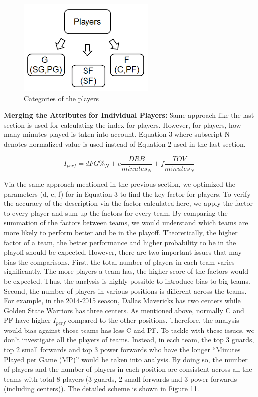 \documentclass{acm_proc_article-sp}
\begin{document}
\begin{figure}[!htb]
\centering
\includegraphics{Fig-10.png}
\caption{Categories of the players}
\end{figure}

\textbf{Merging the Attributes for Individual Players:} Same approach like the last section is used for calculating the index for players. However, for players, how many minutes played is taken into account. Equation 3 where subscript N denotes normalized value is used instead of Equation 2 used in the last section.   

\begin{equation}
I_{perf} = dFG\%_{N} + e \frac{DRB}{minutes_{N}} + f \frac{TOV}{minutes_{N}}
\end{equation}

\vspace{1em}
Via the same approach mentioned in the previous section, we optimized the parameters (d, e, f) for in Equation 3 to find the key factor for players. To verify the accuracy of the description via the factor calculated here, we apply the factor to every player and sum up the factors for every team. By comparing the summation of the factors between teams, we would understand which teams are more likely to perform better and be in the playoff. Theoretically, the higher factor of a team, the better performance and higher probability to be in the playoff should be expected. However, there are two important issues that may bias the comparisons. First, the total number of players in each team varies significantly. The more players a team has, the higher score of the factors would be expected. Thus, the analysis is highly possible to introduce bias to big teams. Second, the number of players in various positions is different across the teams. For example, in the 2014-2015 season, Dallas Mavericks has two centers while Golden State Warriors has three centers. As mentioned above, normally C and PF have higher $I_{perf}$ compared to the other positions. Therefore, the analysis would bias against those teams has less C and PF. To tackle with these issues, we don't investigate all the players of teams. Instead, in each team, the top 3 guards, top 2 small forwards and top 3 power forwards who have the longer ``Minutes Played per Game (MP)'' would be taken into analysis. By doing so, the number of players and the number of players in each position are consistent across all the teams with total 8 players (3 guards, 2 small forwards and 3 power forwards (including centers)). The detailed scheme is shown in Figure 11.
\end{document}
